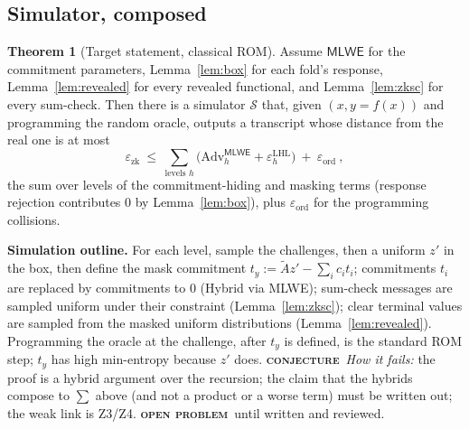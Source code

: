 \documentclass[11pt]{article}
\newcommand{\epitag}[3]{\colorbox{#2}{\textcolor{#1}{\textsc{\footnotesize\bfseries #3}}}}
\newcommand{\conjectureTag}{\epitag{conjyellow}{conjbg}{conjecture}}
\newcommand{\openproblem}{\epitag{openred}{openbg}{open problem}}
\renewcommand{\_}{\textunderscore\allowbreak{}}
\theoremstyle{definition}
\newtheorem{theorem}[definition]{Theorem}
\begin{document}
\subsection{Simulator, composed}
\begin{theorem}[Target statement, classical ROM]
\label{thm:zk}
Assume $\mathsf{MLWE}$ for the commitment parameters, Lemma~\ref{lem:box} for each fold's response, Lemma~\ref{lem:revealed} for every revealed functional, and Lemma~\ref{lem:zksc} for every sum-check. Then there is a simulator $\mathcal{S}$ that, given $(x,y=f(x))$ and programming the random oracle, outputs a transcript whose distance from the real one is at most
\[
 \varepsilon_{\mathrm{zk}}\ \le\ \sum_{\text{levels }h}\Big(\mathrm{Adv}^{\mathsf{MLWE}}_{h}+\varepsilon^{\mathrm{LHL}}_{h}\Big)\ +\ \varepsilon_{\mathrm{ord}}\ ,
\]
the sum over levels of the commitment-hiding and masking terms (response rejection contributes $0$ by Lemma~\ref{lem:box}), plus $\varepsilon_{\mathrm{ord}}$ for the programming collisions.
\end{theorem}
\textbf{Simulation outline.} For each level, sample the challenges, then a uniform $z'$ in the box, then define the mask commitment $t_y:=\tilde Az'-\sum_ic_it_i$; commitments $t_i$ are replaced by commitments to $0$ (Hybrid via MLWE); sum-check messages are sampled uniform under their constraint (Lemma~\ref{lem:zksc}); clear terminal values are sampled from the masked uniform distributions (Lemma~\ref{lem:revealed}). Programming the oracle at the challenge, after $t_y$ is defined, is the standard ROM step; $t_y$ has high min-entropy because $z'$ does.
\conjectureTag\ \textit{How it fails:} the proof is a hybrid argument over the recursion; the claim that the hybrids compose to $\sum$ above (and not a product or a worse term) must be written out; the weak link is Z3/Z4. \openproblem\ until written and reviewed.
\end{document}
